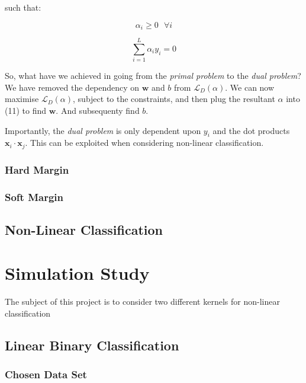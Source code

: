 \documentclass[10pt, a4paper,reqno]{amsart}
\begin{document}
such that:

\begin{equation}
\alpha_i\geq0\text{ }\forall{i}
\end{equation}

\begin{equation}
\sum_{i=1}^{L}\alpha_i y_i = 0
\end{equation}

So, what have we achieved in going from the \emph{primal problem} to the \emph{dual problem}? We have removed the dependency on $\mathbf{w}$ and $b$ from $\mathcal{L}_D(\alpha)$. We can now maximise $\mathcal{L}_D(\alpha)$, subject to the constraints, and then plug the resultant $\alpha$ into (11) to find $\mathbf{w}$. And subsequenty find $b$.

Importantly, the \emph{dual problem} is only dependent upon $y_i$ and the dot products $\mathbf{x}_i\cdot\mathbf{x}_j$. This can be exploited when considering non-linear classification.

\subsubsection{Hard Margin}

\subsubsection{Soft Margin}

\subsection{Non-Linear Classification}


%
%
\clearpage\section{Simulation Study}

The subject of this project is to consider two different kernels for non-linear classification

\subsection{Linear Binary Classification}


\subsubsection{Chosen Data Set}
\end{document}
